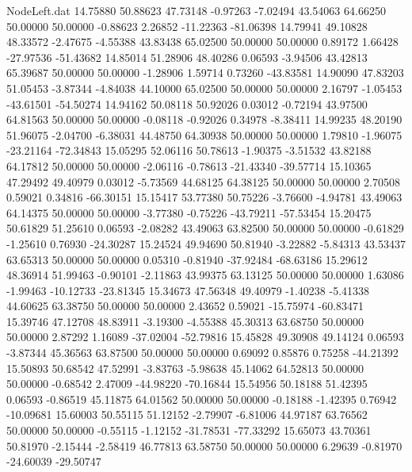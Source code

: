 \begin{filecontents}{NodeLeft.dat}
  14.75880   50.88623   47.73148    -0.97263   -7.02494   43.54063   64.66250   50.00000   50.00000   -0.88623    2.26852  -11.22363  -81.06398
  14.79941   49.10828   48.33572    -2.47675   -4.55388   43.83438   65.02500   50.00000   50.00000    0.89172    1.66428  -27.97536  -51.43682
  14.85014   51.28906   48.40286     0.06593   -3.94506   43.42813   65.39687   50.00000   50.00000   -1.28906    1.59714    0.73260  -43.83581
  14.90090   47.83203   51.05453    -3.87344   -4.84038   44.10000   65.02500   50.00000   50.00000    2.16797   -1.05453  -43.61501  -54.50274
  14.94162   50.08118   50.92026     0.03012   -0.72194   43.97500   64.81563   50.00000   50.00000   -0.08118   -0.92026    0.34978   -8.38411
  14.99235   48.20190   51.96075    -2.04700   -6.38031   44.48750   64.30938   50.00000   50.00000    1.79810   -1.96075  -23.21164  -72.34843
  15.05295   52.06116   50.78613    -1.90375   -3.51532   43.82188   64.17812   50.00000   50.00000   -2.06116   -0.78613  -21.43340  -39.57714
  15.10365   47.29492   49.40979     0.03012   -5.73569   44.68125   64.38125   50.00000   50.00000    2.70508    0.59021    0.34816  -66.30151
  15.15417   53.77380   50.75226    -3.76600   -4.94781   43.49063   64.14375   50.00000   50.00000   -3.77380   -0.75226  -43.79211  -57.53454
  15.20475   50.61829   51.25610     0.06593   -2.08282   43.49063   63.82500   50.00000   50.00000   -0.61829   -1.25610    0.76930  -24.30287
  15.24524   49.94690   50.81940    -3.22882   -5.84313   43.53437   63.65313   50.00000   50.00000    0.05310   -0.81940  -37.92484  -68.63186
  15.29612   48.36914   51.99463    -0.90101   -2.11863   43.99375   63.13125   50.00000   50.00000    1.63086   -1.99463  -10.12733  -23.81345
  15.34673   47.56348   49.40979    -1.40238   -5.41338   44.60625   63.38750   50.00000   50.00000    2.43652    0.59021  -15.75974  -60.83471
  15.39746   47.12708   48.83911    -3.19300   -4.55388   45.30313   63.68750   50.00000   50.00000    2.87292    1.16089  -37.02004  -52.79816
  15.45828   49.30908   49.14124     0.06593   -3.87344   45.36563   63.87500   50.00000   50.00000    0.69092    0.85876    0.75258  -44.21392
  15.50893   50.68542   47.52991    -3.83763   -5.98638   45.14062   64.52813   50.00000   50.00000   -0.68542    2.47009  -44.98220  -70.16844
  15.54956   50.18188   51.42395     0.06593   -0.86519   45.11875   64.01562   50.00000   50.00000   -0.18188   -1.42395    0.76942  -10.09681
  15.60003   50.55115   51.12152    -2.79907   -6.81006   44.97187   63.76562   50.00000   50.00000   -0.55115   -1.12152  -31.78531  -77.33292
  15.65073   43.70361   50.81970    -2.15444   -2.58419   46.77813   63.58750   50.00000   50.00000    6.29639   -0.81970  -24.60039  -29.50747

\end{filecontents}
